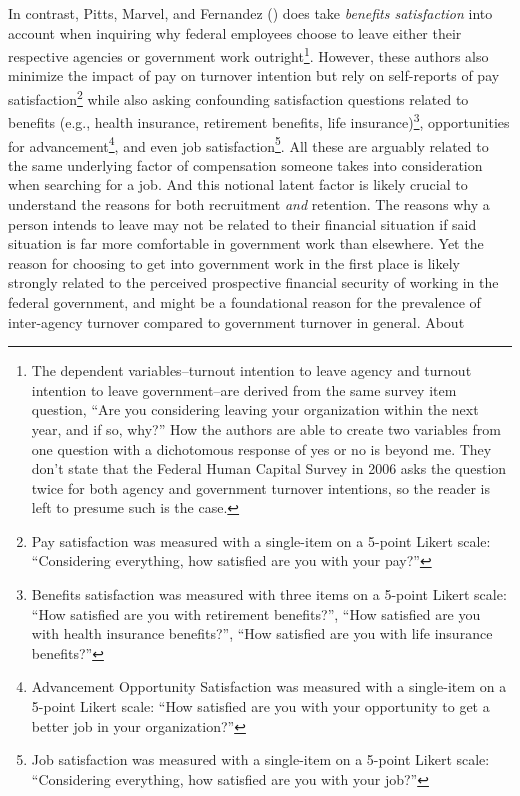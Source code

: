 \documentclass[
  11pt,
  a4paper,
]{article}
\begin{document}
In contrast, Pitts, Marvel, and Fernandez
() does take \emph{benefits satisfaction}
into account when inquiring why federal employees choose to leave either
their respective agencies or government work outright\footnote{The
  dependent variables--turnout intention to leave agency and turnout
  intention to leave government--are derived from the same survey item
  question, ``Are you considering leaving your organization within the
  next year, and if so, why?'' How the authors are able to create two
  variables from one question with a dichotomous response of yes or no
  is beyond me. They don't state that the Federal Human Capital Survey
  in 2006 asks the question twice for both agency and government
  turnover intentions, so the reader is left to presume such is the
  case.}. However, these authors also minimize the impact of pay on
turnover intention but rely on self-reports of pay
satisfaction\footnote{Pay satisfaction was measured with a single-item
  on a 5-point Likert scale: ``Considering everything, how satisfied are
  you with your pay?''} while also asking confounding satisfaction
questions related to benefits (e.g., health insurance, retirement
benefits, life insurance)\footnote{Benefits satisfaction was measured
  with three items on a 5-point Likert scale: ``How satisfied are you
  with retirement benefits?'', ``How satisfied are you with health
  insurance benefits?'', ``How satisfied are you with life insurance
  benefits?''}, opportunities for advancement\footnote{Advancement
  Opportunity Satisfaction was measured with a single-item on a 5-point
  Likert scale: ``How satisfied are you with your opportunity to get a
  better job in your organization?''}, and even job
satisfaction\footnote{Job satisfaction was measured with a single-item
  on a 5-point Likert scale: ``Considering everything, how satisfied are
  you with your job?''}. All these are arguably related to the same
underlying factor of compensation someone takes into consideration when
searching for a job. And this notional latent factor is likely crucial
to understand the reasons for both recruitment \emph{and} retention. The
reasons why a person intends to leave may not be related to their
financial situation if said situation is far more comfortable in
government work than elsewhere. Yet the reason for choosing to get into
government work in the first place is likely strongly related to the
perceived prospective financial security of working in the federal
government, and might be a foundational reason for the prevalence of
inter-agency turnover compared to government turnover in general. About
\end{document}
